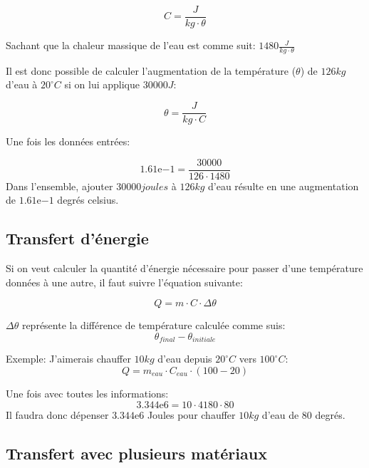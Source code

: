 \documentclass{article}
\begin{document}
\begin{equation}
	C = \frac{J}{kg \cdot \theta}
\end{equation}

Sachant que la chaleur massique de l'eau est comme suit: $1480 \frac{J}{kg \cdot \theta}$

Il est donc possible de calculer l'augmentation de la température ($\theta$) de $126kg$ d'eau à $20^\circ C$ si on lui applique $30000J$:

\begin{equation}
	\theta = \frac{J}{kg \cdot C}
\end{equation}

Une fois les données entrées:

\begin{equation}
	1.61\mathrm{e}{-1} = \frac{30000}{126 \cdot 1480}
\end{equation}
Dans l'ensemble, ajouter $30000 joules$ à $126kg$ d'eau résulte en une augmentation de $1.61\mathrm{e}{-1}$ degrés celsius.

\subsection{Transfert d'énergie}

Si on veut calculer la quantité d'énergie nécessaire pour passer d'une température données à une autre, il faut suivre l'équation suivante:

\begin{equation}
	Q = m \cdot C \cdot \Delta \theta
\end{equation}

$\Delta\theta$ représente la différence de température calculée comme suis:
\begin{equation}
	\theta_{final} - \theta_{initiale}
\end{equation}

Exemple:
J'aimerais chauffer $10kg$ d'eau depuis $20^\circ C$ vers $100^\circ C$:
\begin{equation}
	Q = m_{eau} \cdot C_{eau} \cdot (100 - 20)
\end{equation}

Une fois avec toutes les informations:
\begin{equation}
	3.344\mathrm{e}{6} = 10 \cdot 4180 \cdot 80
\end{equation}
Il faudra donc dépenser $3.344\mathrm{e}{6}$ Joules pour chauffer $10kg$ d'eau de 80 degrés.

\subsection{Transfert avec plusieurs matériaux}
\end{document}
